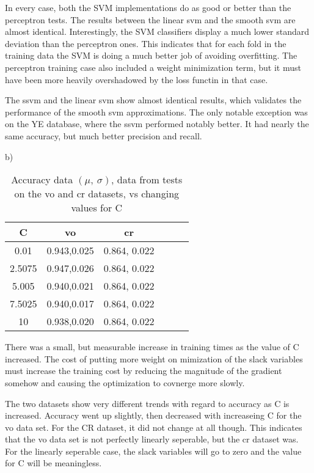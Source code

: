 \documentclass[12pt]{article}
\begin{document}
In every case, both the SVM implementations do as good or better than the perceptron tests. The results between the 
linear svm and the smooth svm are almost identical. Interestingly, the SVM classifiers display a much lower standard 
deviation than the perceptron ones. This indicates that for each fold in the training data the SVM is doing a much better
job of avoiding overfitting. The perceptron training case also included a weight minimization term, but it must 
have been more heavily overshadowed by the loss functin in that case. 

The ssvm and the linear svm show almost identical results, which validates the performance of the smooth svm approximations. 
The only notable exception was on the YE database, where the ssvm performed notably better. It had nearly the same 
accuracy, but much better precision and recall.

b) 

\begin{table}[ht!]
    \begin{tabular}{|c|c|c|c|c|c|} \hline
    C        & vo              & cr  \\ \hline
    0.01     & 0.943,0.025     & 0.864, 0.022 \\ \hline
    2.5075   & 0.947,0.026     & 0.864, 0.022 \\ \hline
    5.005    & 0.940,0.021     & 0.864, 0.022 \\ \hline
    7.5025   & 0.940,0.017     & 0.864, 0.022 \\ \hline
    10       & 0.938,0.020     & 0.864, 0.022 \\ \hline
    
    \hline
    \end{tabular}
    \caption{Accuracy data $(\mu,\ \sigma)$, data from tests on the vo and cr datasets, vs changing values for C}
\end{table}

There was a small, but measurable increase in training times as the value of C increased. The cost of putting more 
weight on mimization of the slack variables must increase the training cost by reducing the magnitude of the 
gradient somehow and causing the optimization to covnerge more slowly. 

The two datasets show very different trends with regard to accuracy as C is increased. Accuracy went up slightly, then 
decreased with increaseing C for the vo data set. For the CR dataset, it did not change at all though. This indicates that
the vo data set is not perfectly linearly seperable, but the cr dataset was. For the linearly seperable case, the 
slack variables will go to zero and the value for C will be meaningless. 
\end{document}
